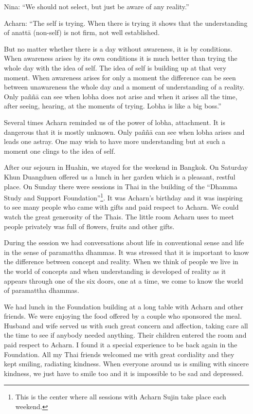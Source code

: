 Nina: ``We should not select, but just be aware of any reality.''

Acharn: ``The self is trying. When there is trying it shows that the
understanding of anattā (non-self) is not firm, not well established.

But no matter whether there is a day without awareness, it is by
conditions. When awareness arises by its own conditions it is much
better than trying the whole day with the idea of self. The idea of self
is building up at that very moment. When awareness arises for only a
moment the difference can be seen between unawareness the whole day and
a moment of understanding of a reality. Only paññā can see when lobha
does not arise and when it arises all the time, after seeing, hearing,
at the moments of trying. Lobha is like a big boss.''

Several times Acharn reminded us of the power of lobha, attachment. It
is dangerous that it is mostly unknown. Only paññā can see when lobha
arises and leads one astray. One may wish to have more understanding but
at such a moment one clings to the idea of self.

After our sejourn in Huahin, we stayed for the weekend in Bangkok. On
Saturday Khun Duangduen offered us a lunch in her garden which is a
pleasant, restful place. On Sunday there were sessions in Thai in the
building of the ``Dhamma Study and Support
Foundation''\footnote{This is the center where all
sessions with Acharn Sujin take place each weekend.}.
It was Acharn's birthday and it was inspiring to see many people who
came with gifts and paid respect to Acharn. We could watch the great
generosity of the Thais. The little room Acharn uses to meet people
privately was full of flowers, fruits and other gifts.

During the session we had conversations about life in conventional sense
and life in the sense of paramattha dhammas. It was stressed that it is
important to know the difference between concept and reality. When we
think of people we live in the world of concepts and when understanding
is developed of reality as it appears through one of the six doors, one
at a time, we come to know the world of paramattha dhammas.

We had lunch in the Foundation building at a long table with Acharn and
other friends. We were enjoying the food offered by a couple who
sponsored the meal. Husband and wife served us with such great concern
and affection, taking care all the time to see if anybody needed
anything. Their children entered the room and paid respect to Acharn. I
found it a special experience to be back again in the Foundation. All my
Thai friends welcomed me with great cordiality and they kept smiling,
radiating kindness. When everyone around us is smiling with sincere
kindness, we just have to smile too and it is impossible to be sad and
depressed.

